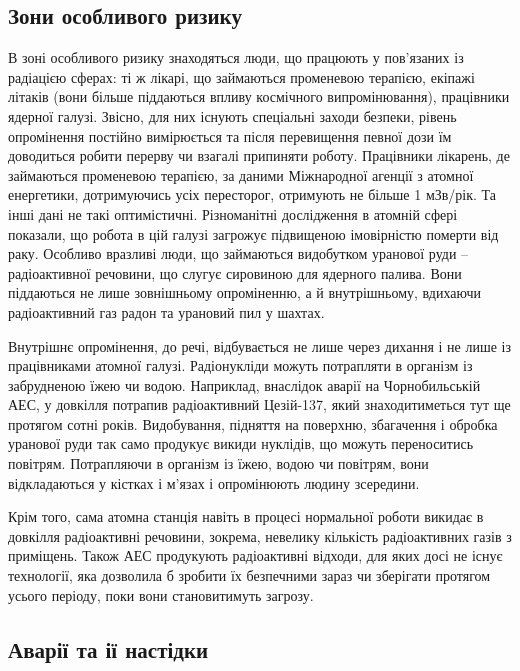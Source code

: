 \documentclass{article}
\begin{document}
\subsection{Зони особливого ризику}

В зоні особливого ризику знаходяться люди, що працюють у пов’язаних із радіацією сферах: ті ж лікарі, що займаються променевою терапією, екіпажі літаків (вони більше піддаються впливу космічного випромінювання), працівники ядерної галузі. Звісно, для них існують спеціальні заходи безпеки, рівень опромінення постійно вимірюється та після перевищення певної дози їм доводиться робити перерву чи взагалі припиняти роботу. Працівники лікарень, де займаються променевою терапією, за даними Міжнародної агенції з атомної енергетики, дотримуючись усіх пересторог, отримують не більше 1 мЗв/рік. Та інші дані не такі оптимістичні. Різноманітні дослідження в атомній сфері показали, що робота в цій галузі загрожує підвищеною імовірністю померти від раку. Особливо вразливі люди, що займаються видобутком уранової руди – радіоактивної речовини, що слугує сировиною для ядерного палива. Вони піддаються не лише зовнішньому опроміненню, а й внутрішньому, вдихаючи радіоактивний газ радон та урановий пил у шахтах.

Внутрішнє опромінення, до речі, відбувається не лише через дихання і не лише із працівниками атомної галузі. Радіонукліди можуть потрапляти в організм із забрудненою їжею чи водою. Наприклад, внаслідок аварії на Чорнобильській АЕС, у довкілля потрапив радіоактивний Цезій-137, який знаходитиметься тут ще протягом сотні років. Видобування, підняття на поверхню, збагачення і обробка уранової руди так само продукує викиди нуклідів, що можуть переноситись повітрям. Потрапляючи в організм із їжею, водою чи повітрям, вони відкладаються у кістках і м’язах і опромінюють людину зсередини.

Крім того, сама атомна станція навіть в процесі нормальної роботи викидає в довкілля радіоактивні речовини, зокрема, невелику кількість радіоактивних газів з приміщень. Також АЕС продукують радіоактивні відходи, для яких досі не існує технології, яка дозволила б зробити їх безпечними зараз чи зберігати протягом усього періоду, поки вони становитимуть загрозу.

\subsection{Аварії та ії настідки}
\end{document}
